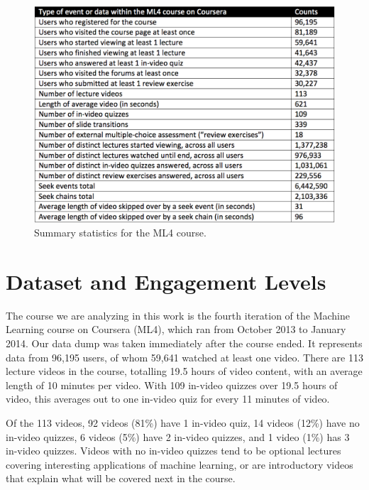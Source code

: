 \documentclass{sigchi}
\begin{document}
\begin{figure}
\includegraphics[width=1.0\columnwidth]{summary-statistics}
\caption{Summary statistics for the ML4 course.}
\label{fig:summary-statistics}
\end{figure}

\section{Dataset and Engagement Levels}

The course we are analyzing in this work is the fourth iteration of the Machine Learning course on Coursera (ML4), which ran from October 2013 to January 2014. Our data dump was taken immediately after the course ended. It represents data from 96,195 users, of whom 59,641 watched at least one video. There are 113 lecture videos in the course, totalling 19.5 hours of video content, with an average length of 10 minutes per video.  With 109  in-video quizzes over 19.5 hours of video, this averages out to one in-video quiz for every 11 minutes of video.

Of the 113 videos, 92 videos (81\%) have 1 in-video quiz, 14 videos (12\%) have no in-video quizzes, 6 videos (5\%) have 2 in-video quizzes, and 1 video (1\%) has 3 in-video quizzes. Videos with no in-video quizzes tend to be optional lectures covering interesting applications of machine learning, or are introductory videos that explain what will be covered next in the course. %
\end{document}
